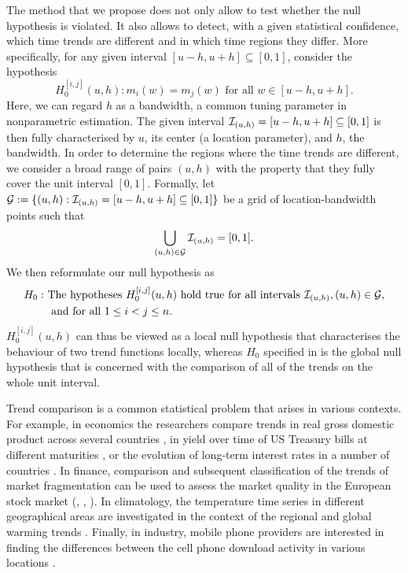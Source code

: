 \documentclass[a4paper,12pt]{article}
\makeatletter
\renewcommand{\eqref}[1]{\tagform@{\ref{#1}}}
\makeatother
\begin{document}
The method that we propose does not only allow to test whether the null hypothesis is violated. It also allows to detect, with a given statistical confidence, which time trends are different and in which time regions they differ. More specifically, for any given interval $[u-h, u+h] \subseteq [0,1]$, consider the hypothesis
\[ H_0^{[i, j]}(u, h): m_i(w) = m_j(w) \text{ for all } w \in [u-h, u+h]. \] 
Here, we can regard $h$ as a bandwidth, a common tuning parameter in nonparametric estimation. The given interval $\mathcal{I}_{(u, h)} = [u-h, u+h] \subseteq [0,1]$ is then fully characterised by $u$, its center (a location parameter), and $h$, the bandwidth. In order to determine the regions where the time trends are different, we consider a broad range of pairs $(u, h)$ with the property that they fully cover the unit interval $[0, 1]$. Formally, let \linebreak $\mathcal{G} := \{(u, h): \mathcal{I}_{(u, h)} = [u-h, u+h] \subseteq [0,1]\}$ be a grid of location-bandwidth points such that 
\begin{align*}
\bigcup_{(u, h) \in \mathcal{G}}  \mathcal{I}_{(u, h)} = [0,1].
\end{align*}
We then reformulate our null hypothesis \eqref{eq:null} as
\begin{align*}
H_0: \ & \text{The hypotheses } H_0^{[i, j]}(u, h) \text{ hold true for all intervals }  \mathcal{I}_{(u, h)}, (u, h) \in \mathcal{G}, \\ & \text{ and for all } 1 \le i < j \le n. 
\end{align*} 
$H_0^{[i, j]}(u, h)$ can thus be viewed as a local null hypothesis that characterises the behaviour of two trend functions locally, whereas $H_0$ specified in \eqref{eq:null} is the global null hypothesis that is concerned with the comparison of all of the trends on the whole unit interval.

Trend comparison is a common statistical problem that arises in various contexts. For example, in economics the researchers compare trends in real gross domestic product across several countries \citep[][]{Grier1989}, in yield over time of US Treasury bills at different maturities \citep[][]{Park2009}, or the evolution of long-term interest rates in a number of countries \citep[][]{Christiansen1997}. In finance, comparison and subsequent classification of the trends of market fragmentation can be used to assess the market quality in the European stock market (\citeauthor{VogtLinton2017}, \citeyear{VogtLinton2017}, \citeyear{VogtLinton2020}). In climatology, the temperature time series in different geographical areas are investigated in the context of the regional and global warming trends \citep[][]{KarolyWu2005}. Finally, in industry, mobile phone providers are interested in finding the differences between the cell phone download activity in various locations \citep[][]{DegrasWu2012}.
\end{document}

